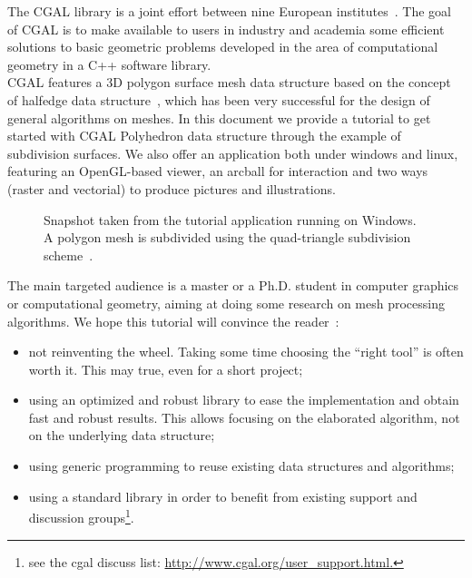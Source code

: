 

The CGAL library is a joint effort between nine European
institutes~\cite{fgkss-dccga-00}. The goal of CGAL is to make
available to users in industry and academia some efficient solutions
to basic geometric problems developed in the area of computational
geometry in a C++ software library.\\


CGAL features a 3D polygon surface mesh data structure based on the
concept of halfedge data structure~\cite{k-ugpdd-99}, which has been
very successful for the design of general algorithms on meshes. In
this document we provide a tutorial to get started with CGAL
Polyhedron data structure through the example of subdivision
surfaces. We also offer an application both under windows and linux,
featuring an OpenGL-based viewer, an arcball for interaction and two
ways (raster and vectorial) to produce pictures and illustrations.\\


\begin{figure}[htb]
    \caption{Snapshot taken from the tutorial application running
             on Windows. A polygon mesh is subdivided using the
             quad-triangle subdivision scheme~\cite{sl-qts-02}.}
    \label{fig:teaser}
\end{figure}
        


The main targeted audience is a master or a Ph.D. student in computer
graphics or computational geometry, aiming at doing some research on
mesh processing algorithms. We hope this tutorial will convince the
reader~:

\begin{itemize}

\item 
not reinventing the wheel. Taking some time choosing the ``right
tool'' is often worth it. This may true, even for a short project;

\item 
using an optimized and robust library to ease the implementation and
obtain fast and robust results. This allows focusing on the elaborated
algorithm, not on the underlying data structure;

\item 
using generic programming to reuse existing data structures
and algorithms;

\item 
using a standard library in order to benefit from existing support and
discussion groups\footnote{see the cgal discuss list:
\href{http://www.cgal.org/user_support.html}
{http://www.cgal.org/user\_support.html.}}.

\end{itemize}               
